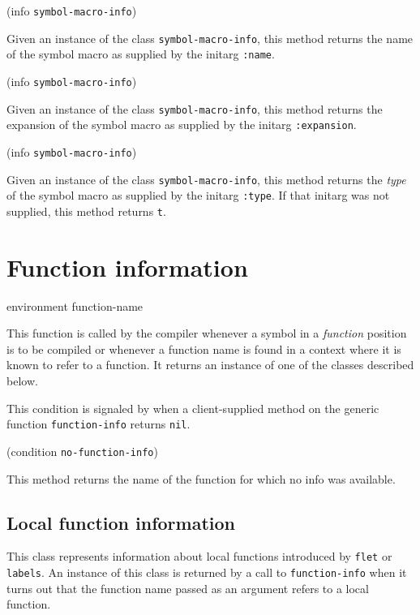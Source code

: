  {(info {\tt symbol-macro-info})}

Given an instance of the class \texttt{symbol-macro-info}, this method
returns the name of the symbol macro as supplied by the initarg
\texttt{:name}.

 {(info {\tt symbol-macro-info})}

Given an instance of the class \texttt{symbol-macro-info}, this method
returns the expansion of the symbol macro as supplied by the initarg
\texttt{:expansion}.

 {(info {\tt symbol-macro-info})}

Given an instance of the class \texttt{symbol-macro-info}, this method
returns the \emph{type} of the symbol macro as supplied by the initarg
\texttt{:type}.  If that initarg was not supplied, this method returns
\texttt{t}.

\section{Function information}

 {environment function-name}

This function is called by the compiler whenever a symbol in a
\emph{function} position is to be compiled or whenever a function name
is found in a context where it is known to refer to a function.  It
returns an instance of one of the classes described below.


This condition is signaled by \sysname{} when a client-supplied method
on the generic function \texttt{function-info} returns \texttt{nil}.

 {(condition {\tt no-function-info})}

This method returns the name of the function for which no info was
available. 

\subsection{Local function information}


This class represents information about local functions introduced by
\texttt{flet} or \texttt{labels}.  An instance of this class is
returned by a call to \texttt{function-info} when it turns out that
the function name passed as an argument refers to a local function. 

